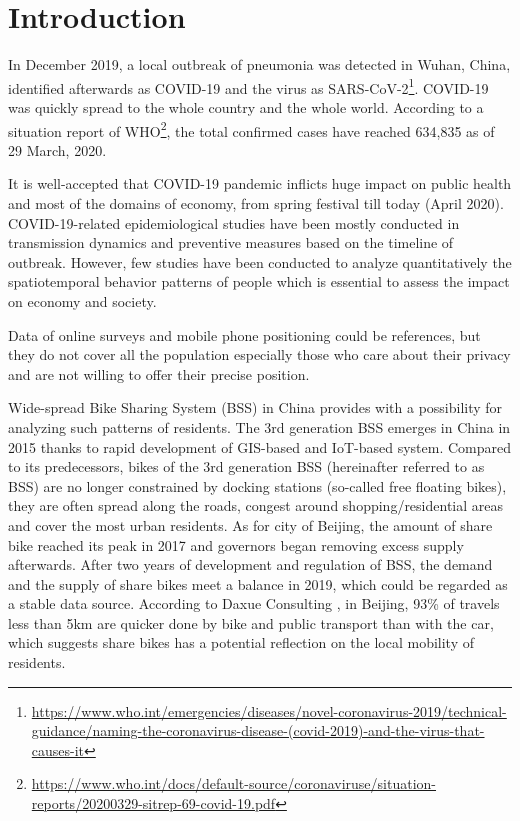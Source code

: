 \documentclass[preprints,ijgi,submit,moreauthors]{Definitions/mdpi}
\begin{document}
\section{Introduction}
In December 2019, a local outbreak of pneumonia was detected in Wuhan, China, identified afterwards as COVID-19 and the virus as SARS-CoV-2\footnote{\url{https://www.who.int/emergencies/diseases/novel-coronavirus-2019/technical-guidance/naming-the-coronavirus-disease-(covid-2019)-and-the-virus-that-causes-it}}.
COVID-19 was quickly spread to the whole country and the whole world.
According to a situation report of WHO\footnote{\url{https://www.who.int/docs/default-source/coronaviruse/situation-reports/20200329-sitrep-69-covid-19.pdf}}, the total confirmed cases have reached 634,835 as of 29 March, 2020.

It is well-accepted that COVID-19 pandemic inflicts huge impact on public health and most of the domains of economy, from spring festival till today (April 2020).
COVID-19-related epidemiological studies have been mostly conducted in transmission dynamics \cite{li2020early,pitzer2009demographic} and preventive measures \cite{chinazzi2020effect,van2006today} based on the timeline of outbreak.
However, few studies have been conducted to analyze quantitatively the spatiotemporal behavior patterns of people which is essential to assess the impact on economy and society.

Data of online surveys and mobile phone positioning could be references, but they do not cover all the population especially those who care about their privacy and are not willing to offer their precise position.

Wide-spread Bike Sharing System (BSS) in China provides with a possibility for analyzing such patterns of residents.
The 3rd generation BSS emerges in China in 2015 thanks to rapid development of GIS-based and IoT-based system. 
Compared to its predecessors, bikes of the 3rd generation BSS (hereinafter referred to as BSS) are no longer constrained by docking stations (so-called free floating bikes), they are often spread along the roads, congest around shopping/residential areas and cover the most urban residents. 
As for city of Beijing, the amount of share bike reached its peak in 2017 and governors began removing excess supply afterwards. 
After two years of development and regulation of BSS, the demand and the supply of share bikes meet a balance in 2019, which could be regarded as a stable data source.
According to Daxue Consulting \cite{bssmodel}, in Beijing, 93\% of travels less than 5km are quicker done by bike and public transport than with the car, which suggests share bikes has a potential reflection on the local mobility of residents.
\end{document}
